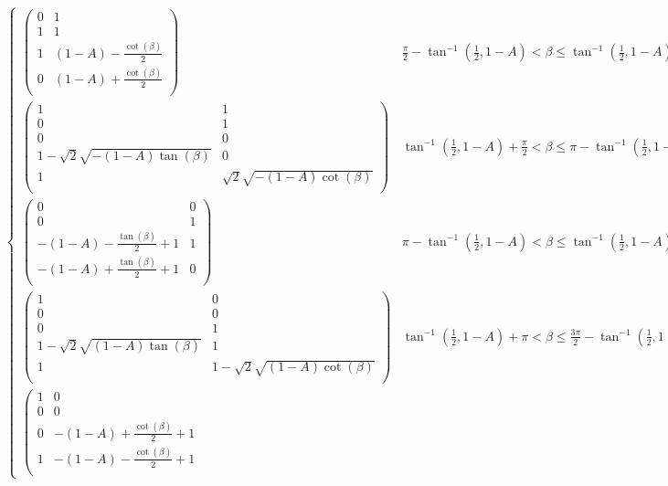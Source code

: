 \documentclass[conference]{IEEEtran}
\begin{document}
\begin{table*}
\begin{align}
\begin{cases}
 \left(
\begin{array}{cc}
 0 & 1 \\
 1 & 1 \\
 1 & (1-A)-\frac{\cot (\beta )}{2} \\
 0 & (1-A)+\frac{\cot (\beta )}{2} \\
\end{array}
\right) & \frac{\pi }{2}-\tan ^{-1}\left(\frac{1}{2},1-A\right)<\beta \leq \tan ^{-1}\left(\frac{1}{2},1-A\right)+\frac{\pi }{2} \\
 \left(
\begin{array}{cc}
 1 & 1 \\
 0 & 1 \\
 0 & 0 \\
 1-\sqrt{2} \sqrt{-(1-A) \tan (\beta )} & 0 \\
 1 & \sqrt{2} \sqrt{-(1-A) \cot (\beta )} \\
\end{array}
\right) & \tan ^{-1}\left(\frac{1}{2},1-A\right)+\frac{\pi }{2}<\beta \leq \pi -\tan ^{-1}\left(\frac{1}{2},1-A\right) \\
 \left(
\begin{array}{cc}
 0 & 0 \\
 0 & 1 \\
 -(1-A)-\frac{\tan (\beta )}{2}+1 & 1 \\
 -(1-A)+\frac{\tan (\beta )}{2}+1 & 0 \\
\end{array}
\right) & \pi -\tan ^{-1}\left(\frac{1}{2},1-A\right)<\beta \leq \tan ^{-1}\left(\frac{1}{2},1-A\right)+\pi  \\
 \left(
\begin{array}{cc}
 1 & 0 \\
 0 & 0 \\
 0 & 1 \\
 1-\sqrt{2} \sqrt{(1-A) \tan (\beta )} & 1 \\
 1 & 1-\sqrt{2} \sqrt{(1-A) \cot (\beta )} \\
\end{array}
\right) & \tan ^{-1}\left(\frac{1}{2},1-A\right)+\pi <\beta \leq \frac{3 \pi }{2}-\tan ^{-1}\left(\frac{1}{2},1-A\right) \\
 \left(
\begin{array}{cc}
 1 & 0 \\
 0 & 0 \\
 0 & -(1-A)+\frac{\cot (\beta )}{2}+1 \\
 1 & -(1-A)-\frac{\cot (\beta )}{2}+1 \\

\end{array}
\end{cases}
\end{align}
\end{table*}
\end{document}
